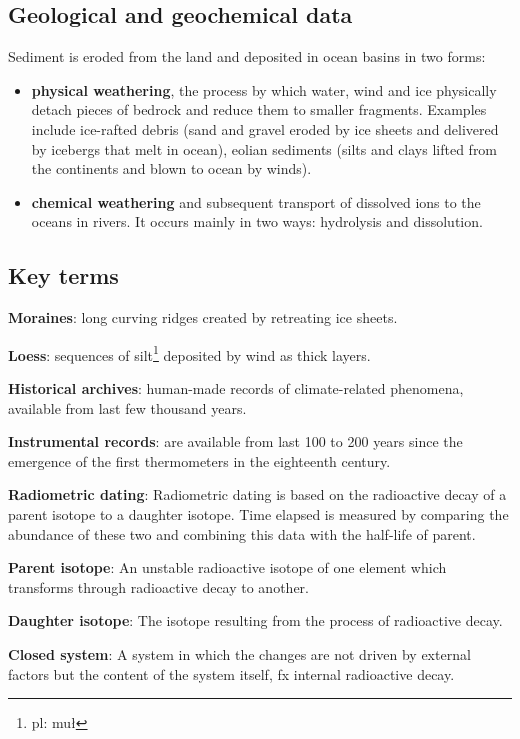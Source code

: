 \subsection{Geological and geochemical data}

Sediment is eroded from the land and deposited in ocean basins in two forms:
\begin{itemize}
	\item \textbf{physical weathering}, the process by which water, wind
	and ice physically detach pieces of bedrock and reduce them to smaller
	fragments. Examples include ice-rafted debris (sand and gravel eroded
	by ice sheets and delivered by icebergs that melt in ocean), eolian
	sediments (silts and clays lifted from the continents and blown to
	ocean by winds).
	\item \textbf{chemical weathering} and subsequent transport of
	dissolved ions to the oceans in rivers. It occurs mainly in two ways:
	hydrolysis and dissolution.
\end{itemize}

\subsection{Key terms}

\textbf{Moraines}: long curving ridges created by retreating ice sheets.

\textbf{Loess}: sequences of silt\footnote{pl: muł} deposited by wind as thick
layers.

\textbf{Historical archives}: human-made records of climate-related phenomena,
available from last few thousand years.

\textbf{Instrumental records}: are available from last 100 to 200 years since
the emergence of the first thermometers in the eighteenth century.

\textbf{Radiometric dating}: Radiometric dating is based on the radioactive
decay of a parent isotope to a daughter isotope. Time elapsed is measured by
comparing the abundance of these two and combining this data with the half-life
of parent.

\textbf{Parent isotope}: An unstable radioactive isotope of one element which
transforms through radioactive decay to another.

\textbf{Daughter isotope}: The isotope resulting from the process of
radioactive decay.

\textbf{Closed system}: A system in which the changes are not driven by
external factors but the content of the system itself, fx internal
radioactive decay.


